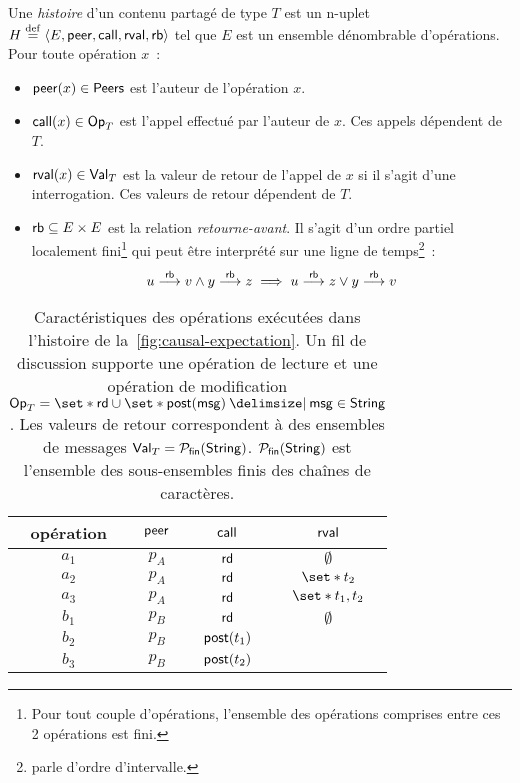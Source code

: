 \begin{definition}\label{def:history}
Une \emph{histoire} d'un contenu partagé de type $T$ est un n-uplet $H \defeq \tuple*{E, \trm{peer}, \trm{call}, \trm{rval}, \trm{rb}}$ tel que $E$ est un ensemble dénombrable d'opérations.
Pour toute opération $x$~:
\begin{itemize}
\item $\trm{peer}(x) \in \trm{Peers}$ est l'auteur de l'opération $x$.
\item $\trm{call}(x) \in \trm{Op}_T$ est l'appel effectué par l'auteur de $x$.
Ces appels dépendent de $T$.
\item $\trm{rval}(x) \in \trm{Val}_T$ est la valeur de retour de l'appel de $x$ si il s'agit d'une interrogation.
Ces valeurs de retour dépendent de $T$.
\end{itemize}
\begin{itemize}[leftmargin=*]
\item[] $\trm{rb} \subseteq E \times E$ est la relation \emph{retourne-avant}.
Il s'agit d'un ordre partiel localement fini\footnote{Pour tout couple d'opérations, l'ensemble des opérations comprises entre ces 2 opérations est fini.} qui peut être interprété sur une ligne de temps\footnote{\textcite{greenough_1976_semiorder} parle d'ordre d'intervalle.}~:
\begin{equation*}
    u \rb v \land y \rb z \implies u \rb z \lor y \rb v
\end{equation*}
\end{itemize}
\end{definition}

\begin{table}[ht]
    \centering
    \begin{tabular}{cccc}
        opération & $\trm{peer}$ & $\trm{call}$ & $\trm{rval}$ \\
        \toprule
        $a_1$ & $p_A$ & $\trm{rd}$ & $\emptyset$ \\
        $a_2$ & $p_A$ & $\trm{rd}$ & $\set*{t_2}$ \\
        $a_3$ & $p_A$ & $\trm{rd}$ & $\set*{t_1, t_2}$ \\
        $b_1$ & $p_B$ & $\trm{rd}$ & $\emptyset$ \\
        $b_2$ & $p_B$ & $\trm{post}(t_1)$ & \\
        $b_3$ & $p_B$ & $\trm{post}(t_2)$ & \\
    \end{tabular}
    \caption{Caractéristiques des opérations exécutées dans l'histoire de la~\autoref{fig:causal-expectation}.
    Un fil de discussion supporte une opération de lecture et une opération de modification $\trm{Op}_T = \set*{\trm{rd}} \cup \set*{\trm{post}(\trm{msg}) \given \trm{msg} \in \trm{String}}$.
    Les valeurs de retour correspondent à des ensembles de messages $\trm{Val}_T = \powerfset{\trm{String}}$. $\powerfset{\trm{String}}$ est l'ensemble des sous-ensembles finis des chaînes de caractères.}\label{tab:op-attributes}
\end{table}


